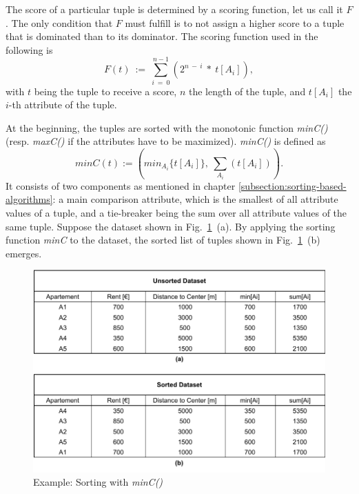 The score of a particular tuple is determined by a scoring function, let us call it $F$. The only condition that $F$ must fulfill is to not assign a higher score to a tuple that is dominated than to its dominator. The scoring function used in the following is 
\begin{equation}
F(t)~:=~\sum_{i~=~0}^{n-1}(2^{n~-~i}~*~t[A_{i}]), 
\end{equation}
with $t$ being the tuple to receive a score, $n$ the length of the tuple, and $t[A_{i}]$ the $i$-th attribute of the tuple. 

At the beginning, the tuples are sorted with the monotonic function \textit{minC()} (resp. \textit{maxC()} if the attributes have to be maximized). \textit{minC()} is defined as 
\begin{equation}
minC(t) := (min_{A_{i}}\{t[A_{i}]\},~\sum_{A_{i}}(t[A_{i}])).
\end{equation}
It consists of two components as mentioned in chapter \ref{subsection:sorting-based-algorithms}: a main comparison attribute, which is the smallest of all attribute values of a tuple, and a tie-breaker being the sum over all attribute values of the same tuple. Suppose the dataset shown in Fig.~\ref{fig:minc}~(a). By applying the sorting function \textit{minC} to the dataset, the sorted list of tuples shown in Fig.~\ref{fig:minc}~(b) emerges. 

\begin{figure}[h]
	\centering
	\includegraphics[width=0.95\linewidth]{figures/minc}
	\caption{Example: Sorting with \textit{minC()}}
	\label{fig:minc}
\end{figure}

